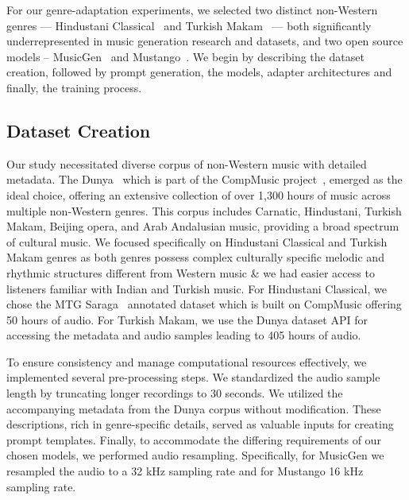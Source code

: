 For our genre-adaptation experiments, we selected two distinct non-Western genres — Hindustani Classical~\cite{jairazbhoy1971rāgs} and Turkish Makam~\cite{signell2008makam} — both significantly underrepresented in music generation research and datasets, and two open source models -- MusicGen~\cite{c:23} and Mustango~\cite{melechovsky-etal-2024-mustango}. We begin by describing the dataset creation, followed by prompt generation, the models, adapter architectures and finally, the training process.

\subsection{Dataset Creation}


Our study necessitated diverse corpus of non-Western music with detailed metadata. The Dunya~\cite{porter-2013} which is part of the CompMusic project~\cite{serra2014creating}, emerged as the ideal choice, offering an extensive collection of over 1,300 hours of music across multiple non-Western genres. This corpus includes Carnatic, Hindustani, Turkish Makam, Beijing opera, and Arab Andalusian music, providing a broad spectrum of cultural music. We focused specifically on Hindustani Classical and Turkish Makam genres as both genres possess complex culturally specific melodic and rhythmic structures different from Western music \& we had easier access to listeners familiar with Indian and Turkish music. For Hindustani Classical, we chose the MTG Saraga~\cite{srinivasamurthy2021saraga} annotated dataset which is built on CompMusic offering 50 hours of audio. For Turkish Makam, we use the Dunya dataset API for accessing the metadata and audio samples leading to 405 hours of audio. 

To ensure consistency and manage computational resources effectively, we implemented several pre-processing steps. We standardized the audio sample length by truncating longer recordings to 30 seconds. We utilized the accompanying metadata from the Dunya corpus without modification. These descriptions, rich in genre-specific details, served as valuable inputs for creating prompt templates. Finally, to accommodate the differing requirements of our chosen models, we performed audio resampling. Specifically, for MusicGen we resampled the audio to a 32 kHz sampling rate and for Mustango 16 kHz sampling rate.


